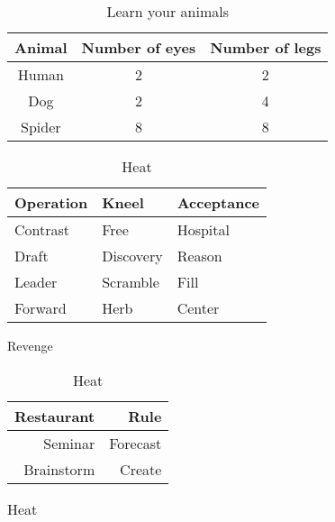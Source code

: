 \documentclass{article}
\begin{document}
\begin{table}
    \centering
    \begin{tabular}{|c|c|c|}
        \hline
        Animal  & Number of eyes    & Number of legs    \\
        \hline
        Human   & 2                 & 2                 \\
        Dog     & 2                 & 4                 \\
        Spider  & 8                 & 8                 \\
        \hline
    \end{tabular}
    \caption{Learn your animals}
    \label{table:animals}
\end{table}

\begin{table}
    \centering
    \begin{subtable}[t]{0.5\textwidth}
        \centering
        \begin{tabular}[t]{l l l}
            \hline
            Operation   & Kneel     & Acceptance    \\
            \hline
            Contrast    & Free      & Hospital      \\
            Draft       & Discovery & Reason        \\
            Leader      & Scramble  & Fill          \\
            Forward     & Herb      & Center        \\
            \hline
        \end{tabular}
        \caption{Revenge}
        \label{table:revenge}
    \end{subtable}
    \hfill
    \begin{subtable}[t]{0.45\textwidth}
        \centering
        \begin{tabular}[t]{r|r}
            \hline
            Restaurant  & Rule      \\
            \hline
            Seminar     & Forecast  \\
            Brainstorm  & Create    \\
            \hline
        \end{tabular}
        \caption{Heat}
        \label{table:heat}
    \end{subtable}
    \newline
    \begin{subtable}{\textwidth}
        \centering
        \begin{tabular}{|r c l c|}

\end{tabular}
\end{subtable}
\end{table}
\end{document}
